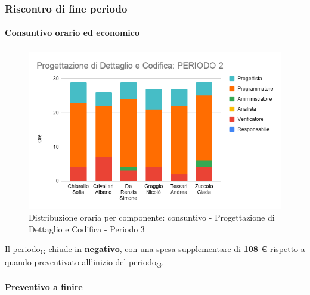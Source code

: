 \subsubsection{Riscontro di fine periodo}



\paragraph{Consuntivo orario ed economico}
\subparagraph*{}

\contabilitaTable{
	
}

\begin{figure}[H]
	\centering
	\includegraphics[scale=0.6]{res/images/charts/consuntivo/prog_dett_2.png}
	\caption{Distribuzione oraria per componente: consuntivo - Progettazione di Dettaglio e Codifica - Periodo 3}
\end{figure}


Il periodo\textsubscript{G} chiude in \textbf{negativo}, con una spesa supplementare di \textbf{108 \euro} rispetto a quando preventivato all'inizio del periodo\textsubscript{G}.


\paragraph{Preventivo a finire}
\subparagraph*{}

\pafTable{
	
}


